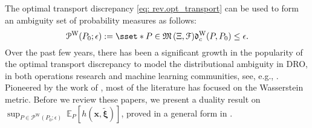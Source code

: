 \documentclass[final,onefignum,onetabnum]{class}
\DeclareMathOperator*{\esssup}{ess\,sup}
\newcommand{\ee}[2]{\mathbb{E}_{#1} \left[ #2 \right]}
\newcommand{\bs}[1]{\boldsymbol{#1}} %
\newcommand{\Bs}[1]{\mathbb{#1}} %
\newcommand{\Cs}[1]{\mathcal{#1}} %
\newcommand{\Fs}[1]{\mathfrak{#1}} %
\newcommand{\txi}{\tilde{\bs{\xi}}}
\newcommand{\measurespace}{\left( \Xi, \Cs{F} \right)}
\renewcommand{\P}{\Fs{P}(\Bs{R}^{d},\Fs{B}(\Bs{R}^{d}))}
\newcommand{\dro}{DRO}
\begin{document}
The optimal transport discrepancy \eqref{eq: rev.opt_transport} can be used to form an ambiguity set of probability measures as follows: %
\begin{equation}
\label{eq: rev.opt.transport.set}
\Cs{P}^{\text{W}}(P_{0}; \epsilon):=\sset*{P\in \Fs{M}\measurespace}{\Fs{d}^{\text{W}}_{c}(P,P_{0})\le \epsilon}. 
\end{equation}
Over the past few years, there has been a significant growth in the popularity of the optimal transport discrepancy to model the distributional ambiguity in \dro, in both operations research and machine learning communities, see, e.g., \citet{pflug2007,mehrotra2014,mohajerin2018,gao2016,chen2018chance,blanchet2018structural,lee2015,luo2019,shafieezadeh2015,sinha2018,lee2018stat,shafieezadeh2018,singh2018}. 
Pioneered by the work of \citet{pflug2007}, most of the literature has focused on the Wasserstein metric. Before we review these papers, we present a  duality result on $\sup_{P \in \Cs{P}^{\text{W}}(P_{0}; \epsilon)} \ \ee{P}{h(\bs{x},\txi)}$, proved in a general form in \citet{blanchet2017DRO}. 
\end{document}
